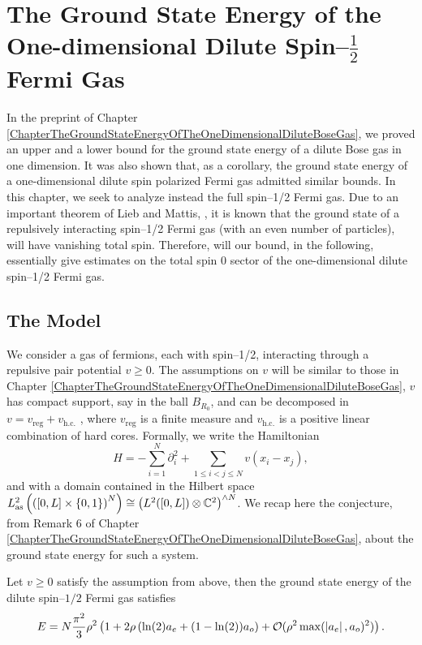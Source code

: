 \chapter{The Ground State Energy of the One-dimensional Dilute Spin--$ \frac{1}{2} $ Fermi Gas}
\label{ChapterTheGroundStateEnergyOfTheOneDimensionalDiluteSpin1/2FermiGas}
In the preprint of Chapter \ref{ChapterTheGroundStateEnergyOfTheOneDimensionalDiluteBoseGas}, we proved an upper and a lower bound for the ground state energy of a dilute Bose gas in one dimension. It was also shown that, as a corollary, the ground state energy of a one-dimensional dilute spin polarized Fermi gas admitted similar bounds. In this chapter, we seek to analyze instead the full spin--1/2 Fermi gas. Due to an important theorem of Lieb and Mattis, \cite{lieb1962theory}, it is known that the ground state of a repulsively interacting spin--1/2 Fermi gas (with an even number of particles), will have vanishing total spin. Therefore, will our bound, in the following, essentially give estimates on the total spin $ 0 $ sector of the one-dimensional dilute spin--1/2 Fermi gas.
\section{The Model}
We consider a gas of fermions, each with spin--1/2, interacting through a repulsive pair potential $ v\geq 0 $. The assumptions on $ v $ will be similar to those in Chapter \ref{ChapterTheGroundStateEnergyOfTheOneDimensionalDiluteBoseGas}, \ie $ v $ has compact support, say in the ball $ B_{R_0} $, and can be decomposed in $ v=v_{\text{reg}}+v_{\text{h.c.}} $ , where $ v_{\text{reg}} $ is a finite measure and $ v_{\text{h.c.}} $ is a positive linear combination of hard cores. Formally, we write the Hamiltonian \begin{equation}\label{EqFermi1/2Hamiltonian}
H=-\sum_{i=1}^{N}\partial_i^2+\sum_{1\leq i<j\leq N} v(x_i-x_j),
\end{equation}
and with a domain contained in the Hilbert space $ L^2_{\text{as}}\left(\left([0,L]\times \{0,1\}\right)^N\right)\cong \left(L^2([0,L])\otimes \mathbb{C}^2\right)^{\wedge N} $.
We recap here the conjecture, from Remark 6 of Chapter \ref{ChapterTheGroundStateEnergyOfTheOneDimensionalDiluteBoseGas}, about the ground state energy for such a system. \begin{conjecture}\label{ConjectureEqCSpin1/2FermiGroundStateEnergy}
	Let $ v\geq0 $ satisfy the assumption from above, then the ground state energy of the dilute spin--$ 1/2 $ Fermi gas satisfies\begin{equation}\label{EqConjectureEqCSpin1/2FermiGroundStateEnergy}
	E=N\frac{\pi^2}{3}\rho^2\left(1+2\rho \left(\ln(2) a_e+(1-\ln(2))a_o\right)+\mathcal{O}(\rho^2\max(\left\lvert a_e \right\rvert,a_o)^2)\right).
	\end{equation}
\end{conjecture}
